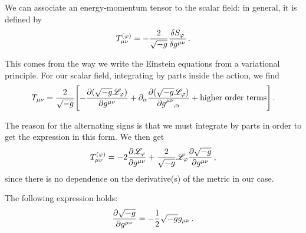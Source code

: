 \documentclass[main.tex]{subfiles}
\begin{document}
We can associate an energy-momentum tensor to the scalar field: in general, it is defined by 
%
\begin{align}
T_{\mu \nu }^{(\varphi )} = - \frac{2}{\sqrt{-g}} \fdv{S_{\varphi }}{g^{\mu \nu }}
\,.
\end{align}

This comes from the way we write the Einstein equations from a variational principle. 
For our scalar field, integrating by parts inside the action, we find 
%
\begin{align}
T_{\mu \nu } = \frac{2}{\sqrt{-g}} \qty[
    -\pdv{(\sqrt{-g} \mathscr{L}_\varphi )}{g^{\mu \nu }}
    +
    \partial_{\alpha }
    \pdv{(\sqrt{-g} \mathscr{L}_\varphi )}{\tensor{g}{^{\mu \nu }_{,\alpha }}} 
    + \text{higher order terms}
]
\,.
\end{align}


The reason for the alternating signs is that we must integrate by parts in order to get the expression in this form. 
We then get 
%
\begin{align}
T^{(\varphi )}_{\mu \nu } = 
- 2 \frac{\partial\mathscr{L}_\varphi }{\partial g^{\mu \nu }} + \frac{2}{\sqrt{-g}} \mathscr{L}_\varphi \pdv{\sqrt{-g}}{g^{\mu \nu }}
\,,
\end{align}
%
since there is no dependence on the derivative(s) of the metric in our case.
\begin{claim}
The following expression holds:
%
\begin{align}
\pdv{\sqrt{-g}}{g^{\mu \nu }} = - \frac{1}{2} \sqrt{-g} g_{\mu \nu }
\,.
\end{align}
\end{claim}
\end{document}
